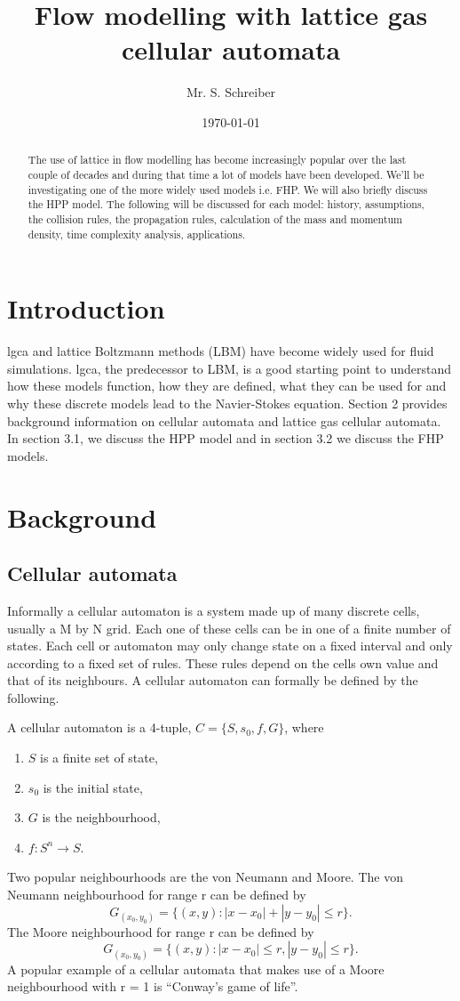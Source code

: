 \documentclass[a4paper,12pt]{article}
\author{Mr. S. Schreiber}
\date{\today}
\title{Flow modelling with lattice gas cellular automata}
\newenvironment{definition}[1][Definition]{\begin{trivlist}
\item[\hskip \labelsep {\bfseries #1}]}{\end{trivlist}}
\begin{document}
\maketitle
\begin{abstract}
The use of lattice in flow modelling has become increasingly popular over the last couple of decades and during that time a lot of models have been developed. We'll be investigating one of the more widely used models i.e. FHP. We will also briefly discuss the HPP model. The following will be discussed for each model: history, assumptions, the collision rules, the propagation rules, calculation of the mass and momentum density, time complexity analysis, applications. 
\end{abstract}
\section{Introduction}
\Acrfull{lgca} and lattice Boltzmann methods (LBM) have become widely used for fluid simulations. \Acrfull{lgca}, the predecessor to LBM, is a good starting point to understand how these models function, how they are defined, what they can be used for and why these discrete models lead to the Navier-Stokes equation. Section 2 provides background information on cellular automata and lattice gas cellular automata. In section 3.1, we discuss the HPP model and in section 3.2 we discuss
the FHP models.
\section{Background}
\subsection{Cellular automata}
Informally a cellular automaton is a system made up of many discrete cells, usually a M by N grid. Each one of these cells can be in one of a finite number of states. Each cell or automaton may only change state on a fixed interval and only according to a fixed set of rules. These rules depend on the cells own value and that of its neighbours. A cellular automaton can formally be defined by the following.
\begin{definition}
A cellular automaton is a 4-tuple, $C = \{S,s_{0},f,G\}$, where
\begin{enumerate}
\item $S$ is a finite set of state,
\item $s_{0}$ is the initial state,
\item $G$ is the neighbourhood,
\item $f:S^{n} \rightarrow S$.
\end{enumerate}
\end{definition}
Two popular neighbourhoods are the von Neumann and Moore.
The von Neumann neighbourhood for range r can be defined by \[ G_{(x_{0}, y_{0})} = \{(x, y): \left|x - x_{0} \right| + \left|y - y_{0}\right| \leq r\}.\]
The Moore neighbourhood for range r can be defined by \[ G_{(x_{0}, y_{0})} = \{(x, y): \left|x - x_{0}\right| \leq r, \left|y - y_{0}\right| \leq r \}.\]
A popular example of a cellular automata that makes use of a Moore neighbourhood with r = 1 is ``Conway's game of life''.
\end{document}
